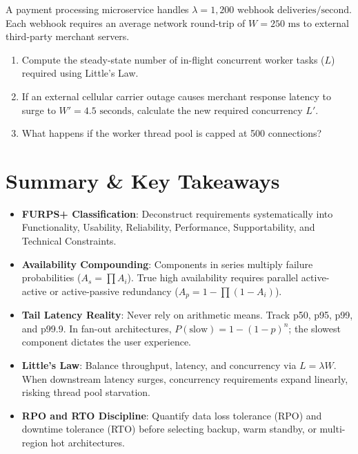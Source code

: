 \begin{tryityourselfbox}
A payment processing microservice handles $\lambda = 1,200\text{ webhook deliveries/second}$. Each webhook requires an average network round-trip of $W = 250\text{ ms}$ to external third-party merchant servers.
\begin{enumerate}
  \item Compute the steady-state number of in-flight concurrent worker tasks ($L$) required using Little's Law.
  \item If an external cellular carrier outage causes merchant response latency to surge to $W' = 4.5\text{ seconds}$, calculate the new required concurrency $L'$.
  \item What happens if the worker thread pool is capped at 500 connections?
\end{enumerate}
\end{tryityourselfbox}

\section{Summary \protect\& Key Takeaways}

\begin{itemize}[leftmargin=18pt]
  \item \textbf{FURPS+ Classification}: Deconstruct requirements systematically into Functionality, Usability, Reliability, Performance, Supportability, and Technical Constraints.
  \item \textbf{Availability Compounding}: Components in series multiply failure probabilities ($A_s = \prod A_i$). True high availability requires parallel active-active or active-passive redundancy ($A_p = 1 - \prod (1 - A_i)$).
  \item \textbf{Tail Latency Reality}: Never rely on arithmetic means. Track p50, p95, p99, and p99.9. In fan-out architectures, $P(\text{slow}) = 1 - (1 - p)^n$; the slowest component dictates the user experience.
  \item \textbf{Little's Law}: Balance throughput, latency, and concurrency via $L = \lambda W$. When downstream latency surges, concurrency requirements expand linearly, risking thread pool starvation.
  \item \textbf{RPO and RTO Discipline}: Quantify data loss tolerance (RPO) and downtime tolerance (RTO) before selecting backup, warm standby, or multi-region hot architectures.
\end{itemize}

